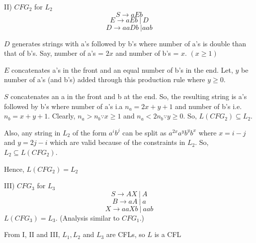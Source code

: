 \documentclass{article}
\begin{document}
    II) $CFG_2$ for $L_2$
    $$S \rightarrow aEb$$
    $$E \rightarrow aEb\ |\ D$$
    $$D \rightarrow aaDb\ | aab$$
    
    \quad $D$ generates strings with a's followed by b's where number of a's is double than that of b's. Say, number of a's = $2x$ and number of b's = $x$. $(x \geq 1)$
    
    \quad $E$ concatenates a's in the front and an equal number of b's in the end. Let, $y$ be number of a's (and b's) added through this production rule where $y \geq 0$.
    
    \quad $S$ concatenates an a in the front and b at the end. So, the resulting string is a's followed by b's where number of a's i.a $n_a = 2x+ y + 1$ and number of b's  i.e. $n_b = x + y + 1$. Clearly, $n_a > n_b \because x \geq 1$ and $n_a < 2n_b \because y \geq 0$. So, $L(CFG_2) \subseteq L_2$. 
    
    \quad Also, any string in $L_2$ of the form $a^ib^j$ can be split as $a^{2x}a^yb^yb^x$ where $x = i-j$ and $y = 2j - i$ which are valid because of the constraints in $L_2$. So,  $L_2 \subseteq L(CFG_2)$.
    
    \quad Hence, $L(CFG_2) = L_2$
    
    III) $CFG_3$ for $L_3$
    $$S \rightarrow AX\ | \ A$$
    $$B \rightarrow aA\ | \ a$$
    $$X \rightarrow aaXb\ | \ aab$$
    \quad $L(CFG_3)  = L_3$. (Analysis similar to $CFG_1$.)
    
    From I, II and III, $L_1, L_2$ and $L_3$ are CFLs, so $L$ is a CFL
    
\end{document}
